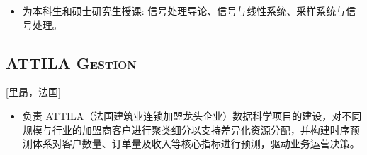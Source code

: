 \documentclass{mycv}
\begin{document}

\begin{positions}
\end{positions}

\begin{itemize}
  \item 为本科生和硕士研究生授课: 信号处理导论、信号与线性系统、采样系统与信号处理。
\end{itemize}

\vspace{-0.5em}

\subsection{\large \scshape ATTILA Gestion}[里昂，法国]


\begin{positions}
\end{positions}

\begin{itemize}
  \item 负责 ATTILA（法国建筑业连锁加盟龙头企业）数据科学项目的建设，对不同规模与行业的加盟商客户进行聚类细分以支持差异化资源分配，并构建时序预测体系对客户数量、订单量及收入等核心指标进行预测，驱动业务运营决策。
\end{itemize}

\vspace{-0.5em}



\end{document}
